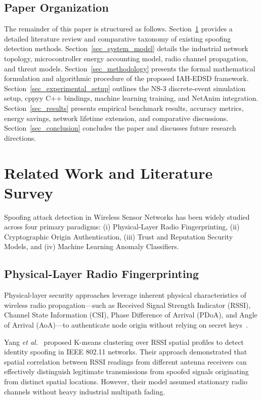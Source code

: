 \documentclass[journal]{IEEEtran}
\begin{document}
\subsection{Paper Organization}
The remainder of this paper is structured as follows. Section~\ref{sec_related_work} provides a detailed literature review and comparative taxonomy of existing spoofing detection methods. Section~\ref{sec_system_model} details the industrial network topology, microcontroller energy accounting model, radio channel propagation, and threat models. Section~\ref{sec_methodology} presents the formal mathematical formulation and algorithmic procedure of the proposed IAH-EDSD framework. Section~\ref{sec_experimental_setup} outlines the NS-3 discrete-event simulation setup, cppyy C++ bindings, machine learning training, and NetAnim integration. Section~\ref{sec_results} presents empirical benchmark results, accuracy metrics, energy savings, network lifetime extension, and comparative discussions. Section~\ref{sec_conclusion} concludes the paper and discusses future research directions.

\section{Related Work and Literature Survey}
\label{sec_related_work}

Spoofing attack detection in Wireless Sensor Networks has been widely studied across four primary paradigms: (i) Physical-Layer Radio Fingerprinting, (ii) Cryptographic Origin Authentication, (iii) Trust and Reputation Security Models, and (iv) Machine Learning Anomaly Classifiers.

\subsection{Physical-Layer Radio Fingerprinting}
Physical-layer security approaches leverage inherent physical characteristics of wireless radio propagation---such as Received Signal Strength Indicator (RSSI), Channel State Information (CSI), Phase Difference of Arrival (PDoA), and Angle of Arrival (AoA)---to authenticate node origin without relying on secret keys~\cite{ref_phy_sec_05, ref_rssi_finger_19}. 

Yang \textit{et al.}~\cite{ref_yang_rssi_20} proposed K-means clustering over RSSI spatial profiles to detect identity spoofing in IEEE 802.11 networks. Their approach demonstrated that spatial correlation between RSSI readings from different antenna receivers can effectively distinguish legitimate transmissions from spoofed signals originating from distinct spatial locations. However, their model assumed stationary radio channels without heavy industrial multipath fading.
\end{document}

